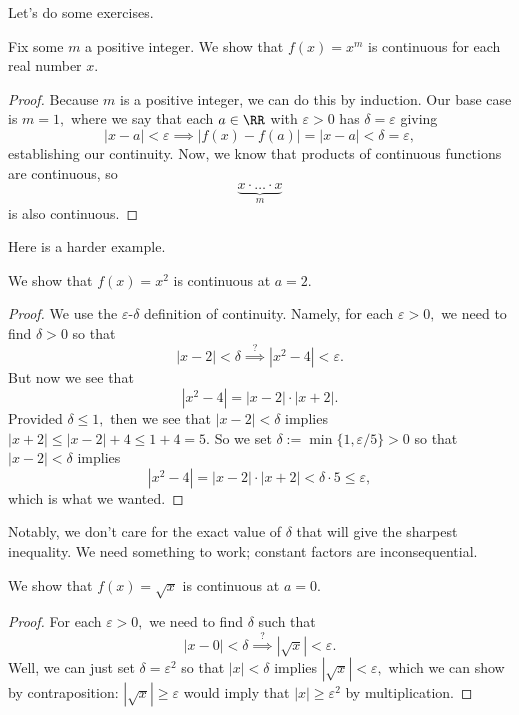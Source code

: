 \documentclass[../notes.tex]{subfiles}
\begin{document}
Let's do some exercises.
\begin{exercise}[Ross 17.5]
	Fix some $m$ a positive integer. We show that $f(x)=x^m$ is continuous for each real number $x.$
\end{exercise}
\begin{proof}
	Because $m$ is a positive integer, we can do this by induction. Our base case is $m=1,$ where we say that each $a\in\RR$ with $\varepsilon>0$ has $\delta=\varepsilon$ giving
	\[|x-a|<\varepsilon\implies|f(x)-f(a)|=|x-a|<\delta=\varepsilon,\]
	establishing our continuity. Now, we know that products of continuous functions are continuous, so
	\[\underbrace{x\cdot\ldots\cdot x}_{m}\]
	is also continuous.
\end{proof}
Here is a harder example.
\begin{exercise}[Ross 17.9(a)]
	We show that $f(x)=x^2$ is continuous at $a=2.$
\end{exercise}
\begin{proof}
	We use the $\varepsilon$-$\delta$ definition of continuity. Namely, for each $\varepsilon>0,$ we need to find $\delta>0$ so that
	\[|x-2|<\delta\stackrel?\implies\left|x^2-4\right|<\varepsilon.\]
	But now we see that
	\[\left|x^2-4\right|=|x-2|\cdot|x+2|.\]
	Provided $\delta\le1,$ then we see that $|x-2|<\delta$ implies $|x+2|\le|x-2|+4\le1+4=5.$ So we set $\delta:=\min\{1,\varepsilon/5\}>0$ so that $|x-2|<\delta$ implies
	\[\left|x^2-4\right|=|x-2|\cdot|x+2|<\delta\cdot5\le\varepsilon,\]
	which is what we wanted.
\end{proof}
Notably, we don't care for the exact value of $\delta$ that will give the sharpest inequality. We need something to work; constant factors are inconsequential.
\begin{exercise}[Ross 17.9(b)]
	We show that $f(x)=\sqrt x$ is continuous at $a=0.$
\end{exercise}
\begin{proof}
	For each $\varepsilon>0,$ we need to find $\delta$ such that
	\[|x-0|<\delta\stackrel?\implies\left|\sqrt{x}\right|<\varepsilon.\]
	Well, we can just set $\delta=\varepsilon^2$ so that $|x|<\delta$ implies $|\sqrt x|<\varepsilon,$ which we can show by contraposition: $|\sqrt x|\ge\varepsilon$ would imply that $|x|\ge\varepsilon^2$ by multiplication.
\end{proof}
\end{document}
